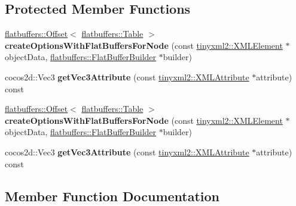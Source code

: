 \subsection*{Protected Member Functions}
\begin{DoxyCompactItemize}
\item 
\mbox{\label{classcocostudio_1_1Node3DReader_ae2d0f90153d0adb44bcf00de45bbb161}} 
\hyperlink{structflatbuffers_1_1Offset}{flatbuffers\+::\+Offset}$<$ \hyperlink{classflatbuffers_1_1Table}{flatbuffers\+::\+Table} $>$ {\bfseries create\+Options\+With\+Flat\+Buffers\+For\+Node} (const \hyperlink{classtinyxml2_1_1XMLElement}{tinyxml2\+::\+X\+M\+L\+Element} $\ast$object\+Data, \hyperlink{classflatbuffers_1_1FlatBufferBuilder}{flatbuffers\+::\+Flat\+Buffer\+Builder} $\ast$builder)
\item 
\mbox{\label{classcocostudio_1_1Node3DReader_a730210d7179de94b9273ca3f44f9cbf8}} 
cocos2d\+::\+Vec3 {\bfseries get\+Vec3\+Attribute} (const \hyperlink{classtinyxml2_1_1XMLAttribute}{tinyxml2\+::\+X\+M\+L\+Attribute} $\ast$attribute) const
\item 
\mbox{\label{classcocostudio_1_1Node3DReader_a9892ec7f01af9aa79a899cc6f125ea93}} 
\hyperlink{structflatbuffers_1_1Offset}{flatbuffers\+::\+Offset}$<$ \hyperlink{classflatbuffers_1_1Table}{flatbuffers\+::\+Table} $>$ {\bfseries create\+Options\+With\+Flat\+Buffers\+For\+Node} (const \hyperlink{classtinyxml2_1_1XMLElement}{tinyxml2\+::\+X\+M\+L\+Element} $\ast$object\+Data, \hyperlink{classflatbuffers_1_1FlatBufferBuilder}{flatbuffers\+::\+Flat\+Buffer\+Builder} $\ast$builder)
\item 
\mbox{\label{classcocostudio_1_1Node3DReader_aae06e57cf04643b0aef9410e0a860b37}} 
cocos2d\+::\+Vec3 {\bfseries get\+Vec3\+Attribute} (const \hyperlink{classtinyxml2_1_1XMLAttribute}{tinyxml2\+::\+X\+M\+L\+Attribute} $\ast$attribute) const
\end{DoxyCompactItemize}


\subsection{Member Function Documentation}
\mbox{\label{classcocostudio_1_1Node3DReader_a71968894f221705af6259ab4f8482e3b}} 
